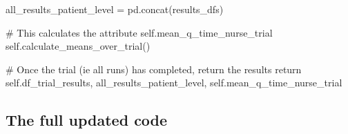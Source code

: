 \documentclass[
  letterpaper,
  DIV=11,
  numbers=noendperiod]{scrreprt}
\newenvironment{Shaded}{\begin{snugshade}}{\end{snugshade}}
\newcommand{\CommentTok}[1]{\textcolor[rgb]{0.37,0.37,0.37}{#1}}
\newcommand{\ControlFlowTok}[1]{\textcolor[rgb]{0.00,0.23,0.31}{#1}}
\newcommand{\NormalTok}[1]{\textcolor[rgb]{0.00,0.23,0.31}{#1}}
\newcommand{\OperatorTok}[1]{\textcolor[rgb]{0.37,0.37,0.37}{#1}}
\newcommand{\VariableTok}[1]{\textcolor[rgb]{0.07,0.07,0.07}{#1}}
\begin{document}
\begin{Shaded}
\begin{Highlighting}[]
\NormalTok{    all\_results\_patient\_level }\OperatorTok{=}\NormalTok{ pd.concat(results\_dfs)}

    \CommentTok{\# This calculates the attribute self.mean\_q\_time\_nurse\_trial}
    \VariableTok{self}\NormalTok{.calculate\_means\_over\_trial()}

    \CommentTok{\# Once the trial (ie all runs) has completed, return the results}
    \ControlFlowTok{return} \VariableTok{self}\NormalTok{.df\_trial\_results, all\_results\_patient\_level, }\VariableTok{self}\NormalTok{.mean\_q\_time\_nurse\_trial}
\end{Highlighting}
\end{Shaded}

\subsection{The full updated code}\label{the-full-updated-code}
\end{document}
